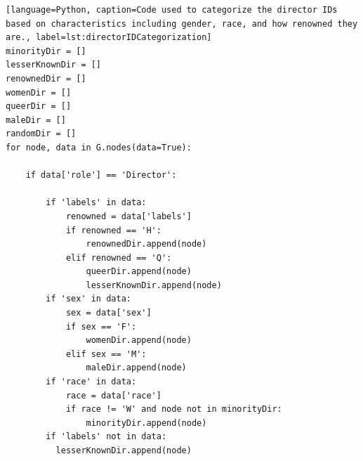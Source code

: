 \documentclass[12pt]{article}
\begin{document}
\begin{lstlisting}[language=Python, caption=Code used to categorize the director IDs based on characteristics including gender, race, and how renowned they are., label=lst:directorIDCategorization]
minorityDir = []
lesserKnownDir = []
renownedDir = []
womenDir = []
queerDir = []
maleDir = []
randomDir = []
for node, data in G.nodes(data=True):
    
    if data['role'] == 'Director':

        if 'labels' in data:
            renowned = data['labels']
            if renowned == 'H':
                renownedDir.append(node)
            elif renowned == 'Q':
                queerDir.append(node)
                lesserKnownDir.append(node)
        if 'sex' in data:
            sex = data['sex']
            if sex == 'F':
                womenDir.append(node)
            elif sex == 'M':
                maleDir.append(node)
        if 'race' in data:
            race = data['race']
            if race != 'W' and node not in minorityDir:
                minorityDir.append(node)
        if 'labels' not in data:
          lesserKnownDir.append(node)
\end{lstlisting}
\end{document}
